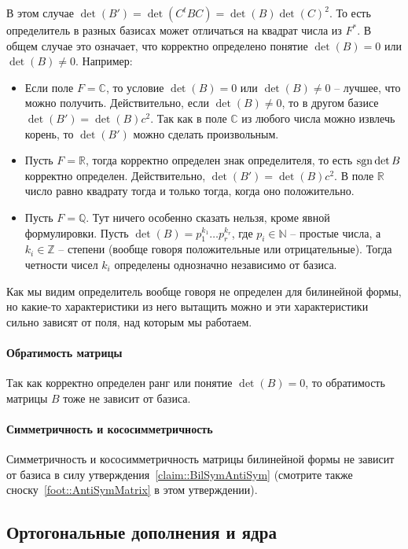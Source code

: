 В этом случае $\det(B') = \det(C^t B C) = \det(B) \det (C)^2$. То есть определитель в разных базисах может отличаться на квадрат числа из $F^*$. В общем случае это означает, что корректно определено понятие $\det(B) = 0$ или $\det(B)\neq 0$. Например:
\begin{itemize}
\item Если поле $F = \mathbb C$, то условие $\det(B) = 0$ или $\det(B)\neq 0$ -- лучшее, что можно получить. Действительно, если $\det(B)\neq 0$, то в другом базисе $\det(B') = \det(B)c^2$. Так как в поле $\mathbb C$ из любого числа можно извлечь корень, то $\det(B')$ можно сделать произвольным.
\item Пусть $F = \mathbb R$, тогда корректно определен знак определителя, то есть $\operatorname{sgn} \det B$ корректно определен. Действительно, $\det(B') = \det(B) c^2$. В поле $\mathbb R$ число равно квадрату тогда и только тогда, когда оно положительно.
\item Пусть $F = \mathbb Q$. Тут ничего особенно сказать нельзя, кроме явной формулировки. Пусть $\det(B) = p_1^{k_1}\ldots p_r^{k_r}$, где $p_i\in \mathbb N$ -- простые числа, а $k_i\in \mathbb Z$ -- степени (вообще говоря положительные или отрицательные). Тогда четности чисел $k_i$ определены однозначно независимо от базиса.
\end{itemize}

Как мы видим определитель вообще говоря не определен для билинейной формы, но какие-то характеристики из него вытащить можно и эти характеристики сильно зависят от поля, над которым мы работаем.

\paragraph{Обратимость матрицы}
Так как корректно определен ранг или понятие $\det(B) = 0$, то обратимость матрицы $B$ тоже не зависит от базиса.

\paragraph{Симметричность и кососимметричность}

Симметричность и кососимметричность матрицы билинейной формы не зависит от базиса в силу утверждения~\ref{claim::BilSymAntiSym} (смотрите также сноску~\ref{foot::AntiSymMatrix} в этом утверждении).

\subsection{Ортогональные дополнения и ядра}


